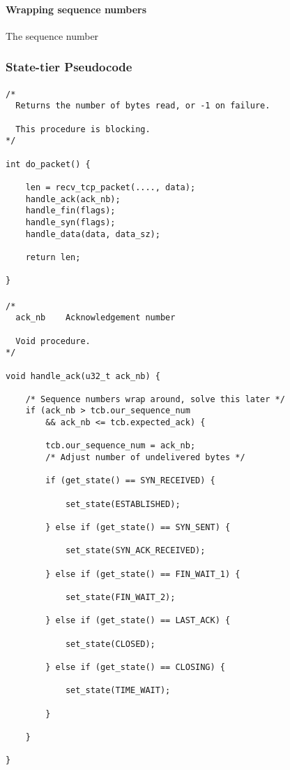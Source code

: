 \documentclass[11pt]{article}
\begin{document}
    
\paragraph{Wrapping sequence numbers}
    The sequence number 
    
\subsubsection{State-tier Pseudocode}


\paragraph{}


\begin{lstlisting}[title=Procedure do\_packet]
/*
  Returns the number of bytes read, or -1 on failure.

  This procedure is blocking.
*/

int do_packet() {

    len = recv_tcp_packet(...., data);
    handle_ack(ack_nb);
    handle_fin(flags);
    handle_syn(flags);
    handle_data(data, data_sz);

    return len;

}
\end{lstlisting}


\paragraph{}


\begin{lstlisting}[title=Procedure handle\_ack]
/*
  ack_nb    Acknowledgement number

  Void procedure.
*/

void handle_ack(u32_t ack_nb) {

    /* Sequence numbers wrap around, solve this later */
    if (ack_nb > tcb.our_sequence_num
        && ack_nb <= tcb.expected_ack) {

        tcb.our_sequence_num = ack_nb;
        /* Adjust number of undelivered bytes */

        if (get_state() == SYN_RECEIVED) {

            set_state(ESTABLISHED);

        } else if (get_state() == SYN_SENT) {

            set_state(SYN_ACK_RECEIVED);

        } else if (get_state() == FIN_WAIT_1) {

            set_state(FIN_WAIT_2);

        } else if (get_state() == LAST_ACK) {

            set_state(CLOSED);

        } else if (get_state() == CLOSING) {

            set_state(TIME_WAIT);

        }

    }

}
\end{lstlisting}
\end{document}
